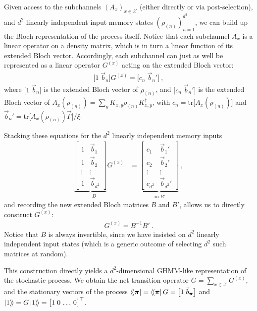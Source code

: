 \documentclass[prx,nofootinbib,onecolumn,showkeys,groupaddress,preprintnumbers,floatfix,
superscriptaddress]{revtex4-1}
\newcommand{\stationary}{\boldsymbol{\pi}}
\newcommand{\dbra}[1]{\bra{ \! \langle #1}}
\newcommand{\dket}[1]{\ket{ #1 \rangle \!}}
\newcommand{\tr}{\text{tr}}
\newcommand{\constname}{\xi}
\begin{document}
Given access to the subchannels $(A_x)_{x \in \mathcal{X}}$ (either directly or via post-selection), and $d^2$ linearly independent 
input memory states $(\rho_{(n)})_{n=1}^{d^2}$,
we can build up the Bloch representation of the process itself.
Notice that each subchannel $A_x$ is a linear operator on
a density matrix, which is in turn a linear function of its extended Bloch vector.  Accordingly, each subchannel can just as well be represented as a linear operator $G^{(x)}$ acting on the extended Bloch vector:
\begin{align}
\bigl[ 1 \; \vec{b}_n \bigr] G^{(x)} = \bigl[ c_n \; \vec{b}_n' \bigr] ~,
\end{align}	
where $\bigl[ 1 \; \vec{b}_n \bigr]$ is the extended Bloch vector of $\rho_{(n)}$, and $ \bigl[ c_n \; \vec{b}_n' \bigr] $ is the extended Bloch vector of $A_x(\rho_{(n)}) = \sum_{y} K_{x,y} \rho_{(n)} K_{x,y}^\dagger$, 
with $c_n = \tr \bigl[ A_x(\rho_{(n)}) \bigr]$
and 
$\vec{b}_n' =  \tr \bigl[ A_x(\rho_{(n)}) \vec{\Gamma} \bigr] / \constname$.

Stacking these equations for the $d^2$ linearly independent memory inputs
\begin{align}
	\underbrace{
	\begin{bmatrix}
		1 & \vec{b}_1 \\
		1 & \vec{b}_2 \\
		\vdots & \vdots \\
		1 & \vec{b}_{d^2} 
	\end{bmatrix}	
}_{\eqqcolon B}
G^{(x)}
&= 
	\underbrace{
	\begin{bmatrix}
		c_1 & \vec{b}_1' \\
		c_2 & \vec{b}_2' \\
		\vdots & \vdots \\
		c_{d^2} & \vec{b}_{d^2}' 
	\end{bmatrix}	
}_{\eqqcolon B'}
 ~,
\end{align}	
and recording the new extended Bloch matrices $B$ and $B'$,
allows us to directly construct $G^{(x)}$: 
\begin{align}
G^{(x)} = B^{-1} B' ~.
\end{align}	
Notice that $B$ is always invertible, 
since we have insisted on $d^2$ linearly independent input states (which is a generic outcome of selecting $d^2$ such matrices at random).


This construction directly yields a $d^2$-dimensional GHMM-like representation of the stochastic process.
We obtain the net transition operator $G = \sum_{x \in \mathcal{X}} G^{(x)}$,
and the stationary vectors of the process $\dbra{\stationary} = \dbra{\stationary} G = \bigl[ 1 \;  \vec{b}_{\stationary} \bigr]$
and $\dket{1} = G \dket{1} = \bigl[ 1 \; 0 \, \dots \, 0 \bigr]^\top$.
\end{document}

